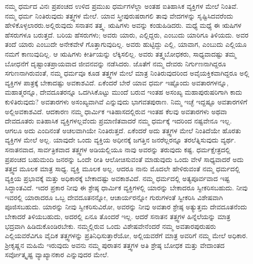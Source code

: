 ನಮ್ಮ ಧರ್ಮದ ವಿನಃ ಪ್ರಪಂಚದ ಉಳಿದ ಪ್ರಮುಖ ಧರ್ಮಗಳೆಲ್ಲಾ ಅಂತಹ ಐತಿಹಾಸಿಕ ವ್ಯಕ್ತಿಗಳ ಮೇಲೆ ನಿಂತಿವೆ. ನಮ್ಮ ಧರ್ಮ ನಿಂತಿರುವುದು ತತ್ತ್ವಗಳ ಮೇಲೆ. ಯಾವ ಸ್ತ್ರೀಪುರುಷರಾಗಲಿ ತಾವು ವೇದಗಳನ್ನು ಸೃಷ್ಟಿಸಿದವರೆಂದು ಹೇಳಿಕೊಳ್ಳಲಾರರು.\break ಅಲ್ಲಿರುವುದು ಸನಾತನ ತತ್ತ್ವ. ಋಷಿಗಳು ಅವನ್ನು ಕಂಡುಹಿಡಿದರು. ಮಧ್ಯೆ ಮಧ್ಯೆ ಈ ಋಷಿಗಳ ಹೆಸರುಗಳೂ ಬರುತ್ತದೆ. ಬರಿಯ ಹೆಸರುಗಳು; ಅವರು ಯಾರು, ಎಲ್ಲಿದ್ದರು, ಎಂಬುದು ಯಾರಿಗೂ ತಿಳಿಯದು. ಅವರ ತಂದೆ ಯಾರು ಎಂಬುದೇ ಅನೇಕವೇಳೆ ಗೊತ್ತಾಗುವುದಿಲ್ಲ. ಅವರು ಹುಟ್ಟಿದ್ದು ಎಲ್ಲಿ, ಯಾವಾಗ, ಎಂಬುದು ಎಲ್ಲಿಯೂ ನಮಗೆ ಕಾಣುವುದಿಲ್ಲ. ಆ ಋಷಿಗಳು ಕೀರ್ತಿಯನ್ನು ಲೆಕ್ಕಿಸಲಿಲ್ಲ. ಅವರು ತತ್ತ್ವಬೋಧಕರು, ಸಾಧ್ಯವಾದಷ್ಟು ತಮ್ಮ ಬೋಧನೆಗೆ ದೃಷ್ಟಾಂತಪ್ರಾಯವಾದ ಜೀವನವನ್ನು ನಡೆಸಿದರು. ಜೊತೆಗೆ ನಮ್ಮ ದೇವರು ನಿರ್ಗುಣನಾಗಿದ್ದರೂ ಸಗುಣನಾಗಿರುವಂತೆ, ನಮ್ಮ ಧರ್ಮವೂ ಕೂಡ ತತ್ತ್ವಗಳ ಮೇಲೆ ಮಾತ್ರ ನಿಂತಿರುವುದರಿಂದ ಅವೈಯಕ್ತಿಕವಾಗಿದ್ದರೂ ಅಲ್ಲಿ ವ್ಯಕ್ತಿಗಳ ಪಾತ್ರಕ್ಕೆ ಬೇಕಾದಷ್ಟು ಅವಕಾಶವಿದೆ. ಏಕೆಂದರೆ ಬೇರೆ ಯಾವ ಧರ್ಮ ಇಷ್ಟೊಂದು ಅವತಾರಗಳನ್ನೂ, ಮಹಾತ್ಮರನ್ನೂ, ದೇವದೂತರನ್ನೂ ಒದಗಿಸಿಕೊಟ್ಟು ಮುಂದೆ ಬರುವ ಇಂತಹ ಅಸಂಖ್ಯ ಮಹಾಪುರುಷರಿಗಾಗಿ ಕಾದು ಕುಳಿತಿರುವುದು? ಅವತಾರಗಳು ಅಸಂಖ್ಯವಾಗಿವೆ ಎನ್ನುವುದು ಭಾಗವತಪುರಾಣ. ನಿಮ್ಮ ಇಚ್ಛೆ ಇದ್ದಷ್ಟೂ ಅವತಾರಗಳಿಗೆ ಅಲ್ಲಿ\break ಅವಕಾಶವಿದೆ. ಆದಕಾರಣ ನಮ್ಮ ಧಾರ್ಮಿಕ ಇತಿಹಾಸದಲ್ಲಿರುವ ಇಂತಹ ಕೆಲವು ಅವತಾರ\-ಗಳು ಅಥವಾ ದೇವದೂತರು ಐತಿಹಾಸಿಕ ವ್ಯಕ್ತಿಗಳಲ್ಲವೆಂದು ಪ್ರಮಾಣಿತವಾದರೆ ನಮ್ಮ ಧರ್ಮಕ್ಕೆ ಇದರಿಂದ ನಷ್ಟವೇನೂ ಇಲ್ಲ. ಆಗಲೂ ಅದು ಎಂದಿನಂತೆ ಅಚಲವಾಗಿಯೇ ನಿಂತಿರುತ್ತದೆ. ಏಕೆಂದರೆ ಅದು ತತ್ತ್ವಗಳ ಮೇಲೆ ನಿಂತಿದೆಯೇ ಹೊರತು ವ್ಯಕ್ತಿಗಳ ಮೇಲೆ ಅಲ್ಲ. ಯಾವುದೇ ಒಂದು ವ್ಯಕ್ತಿಯ ಅಧೀನಕ್ಕೆ ಜಗತ್ತಿನ ಜನರೆಲ್ಲರನ್ನೂ ತರಲೆತ್ನಿಸುವುದು ವ್ಯರ್ಥ. ಸನಾತನವಾದ, ಸಾರ್ವತ್ರಿಕವಾದ ತತ್ತ್ವಗಳ ಅಡಿಯಲ್ಲಿಯೂ ನಾವು ಅವರನ್ನು ತರುವುದು ಕಷ್ಟ. ಧರ್ಮಕ್ಷೇತ್ರದಲ್ಲಿ ಪ್ರಪಂಚದ ಬಹುಮಂದಿ ಜನರನ್ನು ಒಂದೇ ರೀತಿ ಆಲೋಚಿಸುವಂತೆ ಮಾಡುವುದು ಒಂದು ವೇಳೆ ಸಾಧ್ಯವಾದರೆ ಅದು ತತ್ತ್ವದ ಮೂಲಕ ಮಾತ್ರ ಸಾಧ್ಯ. ವ್ಯಕ್ತಿ ಮೂಲಕ ಅಲ್ಲ. ಆದರೂ ನಾನು ಮೊದಲೇ ಹೇಳಿರುವಂತೆ ನಮ್ಮ ಧರ್ಮದಲ್ಲಿ ವ್ಯಕ್ತಿಯ ಪ್ರಭಾವಕ್ಕೆ ಮತ್ತು ಅಧಿಕಾರಕ್ಕೆ ಬೇಕಾದಷ್ಟು ಅವಕಾಶವಿದೆ. ನಮ್ಮ ಧರ್ಮದಲ್ಲಿ ಅತ್ಯಪೂರ್ವವಾದ ಇಷ್ಟ ಸಿದ್ಧಾಂತವಿದೆ. ಇದರ ಪ್ರಕಾರ ನೀವು ಈ ಶ್ರೇಷ್ಠ ಧಾರ್ಮಿಕ ವ್ಯಕ್ತಿಗಳಲ್ಲಿ ಯಾರನ್ನು ಬೇಕಾದರೂ ಸ್ವೀಕರಿಸಬಹುದು. ನೀವು ಇವರಲ್ಲಿ ಯಾರಾದರೂ ಒಬ್ಬ ದೇವದೂತನನ್ನೋ, ಆಚಾರ್ಯರನ್ನೋ ಗುರುಗಳಂತೆ ಸ್ವೀಕರಿಸಿ ವಿಶೇಷವಾಗಿ ಪೂಜಿಸಬಹುದು. ಯಾರನ್ನು ನೀವು ಸ್ವೀಕರಿಸುವಿರೋ, ಅವರನ್ನು ನೀವು ಅವತಾರ ಶ್ರೇಷ್ಠ ಅತ್ಯುತ್ತಮ ದೇವದೂತನೆಂದು ಬೇಕಾದರೆ ತಿಳಿಯಬಹುದು, ಅದರಲ್ಲಿ ಏನೂ ತೊಂದರೆ ಇಲ್ಲ. ಆದರೆ ಸನಾತನ ತತ್ತ್ವಗಳ ಹಿನ್ನೆಲೆಯನ್ನು ಮಾತ್ರ ಭದ್ರವಾಗಿ ಹಿಡಿದುಕೊಂಡಿರಬೇಕು. ನಮ್ಮಲ್ಲಿರುವ ಒಂದು ವಿಶೇಷವೇನೆಂದರೆ ನಮ್ಮ ಅವತಾರಪುರುಷರು ಎಲ್ಲಿಯವರೆವಿಗೂ ವೈದಿಕ ತತ್ತ್ವಗಳನ್ನು ಪ್ರತಿನಿಧಿಸುತ್ತಾರೆಯೋ, ಅಲ್ಲಿಯವರೆಗೆ ಮಾತ್ರ ಅವರಿಗೆ ನಮ್ಮ ಮೇಲೆ ಅಧಿಕಾರ. ಶ‍್ರೀಕೃಷ್ಣನ ಮಹಿಮೆ ಇರುವುದು ಅವನು ನಮ್ಮ ಪುರಾತನ ತತ್ತ್ವಗಳ ಅತಿ ಶ್ರೇಷ್ಠ ಬೋಧಕ ಮತ್ತು ವೇದಾಂತದ ಸರ್ವೋತ್ಕೃಷ್ಟ ವ್ಯಾಖ್ಯಾನಕಾರ ಎನ್ನುವುದರ ಮೇಲೆ.

\vskip 0.2cm

